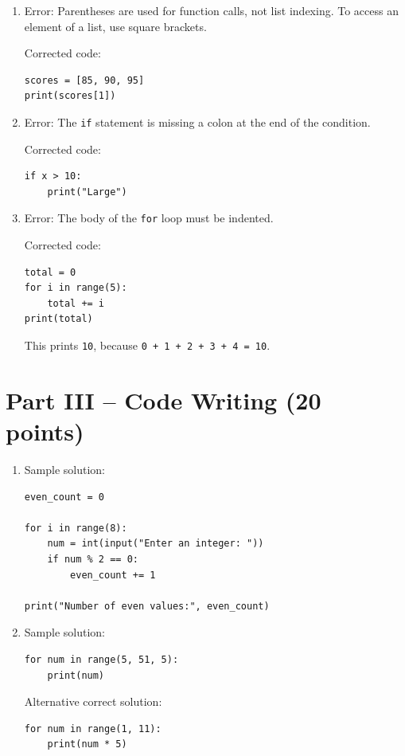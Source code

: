 \documentclass[12pt]{article}
\begin{document}
\begin{enumerate}[resume,label=\arabic*.]
    \item Error: Parentheses are used for function calls, not list indexing. To access an element of a list, use square brackets.

Corrected code:
\begin{lstlisting}
scores = [85, 90, 95]
print(scores[1])
\end{lstlisting}

    \item Error: The \texttt{if} statement is missing a colon at the end of the condition.

Corrected code:
\begin{lstlisting}
if x > 10:
    print("Large")
\end{lstlisting}

    \item Error: The body of the \texttt{for} loop must be indented.

Corrected code:
\begin{lstlisting}
total = 0
for i in range(5):
    total += i
print(total)
\end{lstlisting}

This prints \texttt{10}, because \texttt{0 + 1 + 2 + 3 + 4 = 10}.
\end{enumerate}

\section*{Part III -- Code Writing (20 points)}

\begin{enumerate}[resume,label=\arabic*.]
    \item Sample solution:

\begin{lstlisting}
even_count = 0

for i in range(8):
    num = int(input("Enter an integer: "))
    if num % 2 == 0:
        even_count += 1

print("Number of even values:", even_count)
\end{lstlisting}

    \item Sample solution:

\begin{lstlisting}
for num in range(5, 51, 5):
    print(num)
\end{lstlisting}

Alternative correct solution:

\begin{lstlisting}
for num in range(1, 11):
    print(num * 5)
\end{lstlisting}
\end{enumerate}
\end{document}
